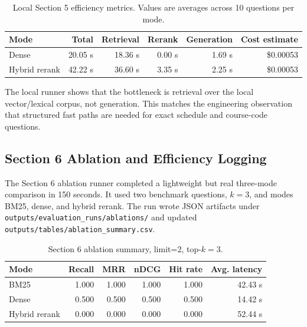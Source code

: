 \documentclass[10pt,a4paper]{article}
\newcommand{\code}[1]{\texttt{\small #1}}
\begin{document}


\begin{table}[H]
\centering
\caption{Local Section 5 efficiency metrics. Values are averages across 10 questions per mode.}
\label{tab:section5-efficiency}
\small
\begin{tabularx}{\linewidth}{Yrrrrr}
\toprule
\textbf{Mode} & \textbf{Total} & \textbf{Retrieval} & \textbf{Rerank} & \textbf{Generation} & \textbf{Cost estimate}\\
\midrule
Dense & 20.05 s & 18.36 s & 0.00 s & 1.69 s & \$0.00053\\
Hybrid rerank & 42.22 s & 36.60 s & 3.35 s & 2.25 s & \$0.00053\\
\bottomrule
\end{tabularx}
\end{table}

The local runner shows that the bottleneck is retrieval over the local vector/lexical corpus, not generation. This matches the engineering observation that structured fast paths are needed for exact schedule and course-code questions.

\subsection{Section 6 Ablation and Efficiency Logging}



The Section 6 ablation runner completed a lightweight but real three-mode comparison in 150 seconds. It used two benchmark questions, $k=3$, and modes BM25, dense, and hybrid rerank. The run wrote JSON artifacts under \code{outputs/evaluation\_runs/ablations/} and updated \code{outputs/tables/ablation\_summary.csv}.

\begin{table}[H]
\centering
\caption{Section 6 ablation summary, limit=2, top-$k=3$.}
\label{tab:section6}
\small
\begin{tabularx}{\linewidth}{Yrrrrr}
\toprule
\textbf{Mode} & \textbf{Recall} & \textbf{MRR} & \textbf{nDCG} & \textbf{Hit rate} & \textbf{Avg. latency}\\
\midrule
BM25 & 1.000 & 1.000 & 1.000 & 1.000 & 42.43 s\\
Dense & 0.500 & 0.500 & 0.500 & 0.500 & 14.42 s\\
Hybrid rerank & 0.000 & 0.000 & 0.000 & 0.000 & 52.44 s\\
\bottomrule
\end{tabularx}
\end{table}
\end{document}
